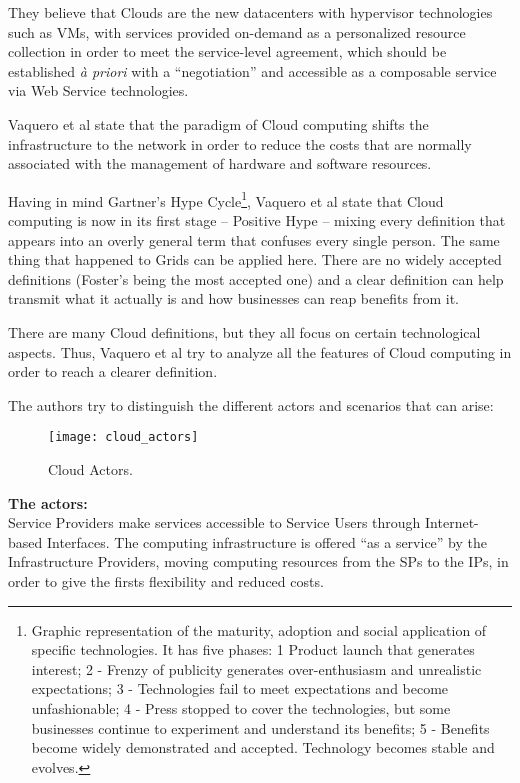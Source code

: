 They believe that Clouds are the new datacenters with hypervisor technologies such as VMs, with services provided on-demand as a personalized resource collection in order to meet the service-level agreement, which should be established \textit{à priori} with a ``negotiation'' and accessible as a composable service via Web Service technologies.


Vaquero et al state that the paradigm of Cloud computing shifts the infrastructure to the network in order to reduce the costs that are normally associated with the management of hardware and software resources.  

Having in mind Gartner’s Hype Cycle\footnote{Graphic representation of the maturity, adoption and social application of specific technologies. It has five phases: 1  Product launch that generates interest; 2 - Frenzy of publicity generates over-enthusiasm and unrealistic expectations; 3 - Technologies fail to meet expectations and become unfashionable; 4 - Press stopped to cover the technologies, but some businesses continue to experiment and understand its benefits; 5 - Benefits become widely demonstrated and accepted. Technology becomes stable and evolves.}, Vaquero et al state that Cloud computing is now in its first stage – Positive Hype – mixing every definition that appears into an overly general term that confuses every single person. The same thing that happened to Grids can be applied here. There are no widely accepted definitions (Foster’s being the most accepted one) and a clear definition can help transmit what it actually is and how businesses can reap benefits from it.

There are many Cloud definitions, but they all focus on certain technological aspects. Thus, Vaquero et al try to analyze all the features of Cloud computing in order to reach a clearer definition.

The authors try to distinguish the different actors and scenarios that can arise:

\begin{figure}[t]
  \begin{center}
    \leavevmode
    \texttt{[image: cloud\_actors]}
    \caption{Cloud Actors.~\cite{Buyya2009599}}
    \label{fig:cloud_actors}
  \end{center}
\end{figure}

\textbf{The actors:}\\
Service Providers make services accessible to Service Users through Internet-based Interfaces. The computing infrastructure is offered “as a service” by the Infrastructure Providers, moving computing resources from the SPs to the IPs, in order to give the firsts flexibility and reduced costs.

